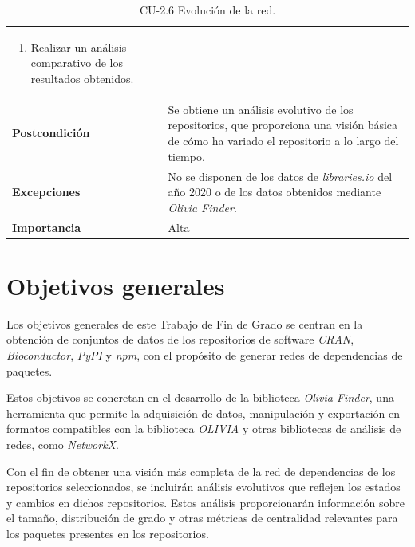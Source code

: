 \begin{table}[p]
\begin{tabularx}{\linewidth}{ p{} p{} }
\begin{enumerate}
			                                \item Realizar un análisis comparativo de los resultados obtenidos.
		                                \end{enumerate}                                                              \\
		\textbf{Postcondición}        & Se obtiene un análisis evolutivo de los repositorios, que proporciona una visión básica de cómo ha variado el repositorio a lo largo del tiempo.                                          \\
		\textbf{Excepciones}          & No se disponen de los datos de \textit{libraries.io} del año 2020 o de los datos obtenidos mediante \textit{Olivia Finder}.                                                               \\
		\textbf{Importancia}          & Alta                                                                                                                                                                                      \\
		\bottomrule
	\end{tabularx}
	\caption{CU-2.6 Evolución de la red.}
	\label{tab:cu2.6}
\end{table}


\section{Objetivos generales}

Los objetivos generales de este Trabajo de Fin de Grado se centran en la obtención de conjuntos de
datos de los repositorios de software \textit{CRAN}, \textit{Bioconductor}, \textit{PyPI} y \textit{npm},
con el propósito de generar redes de dependencias de paquetes.

Estos objetivos se concretan en el desarrollo de la biblioteca \textit{Olivia Finder}, una herramienta
que permite la adquisición de datos, manipulación y exportación en formatos compatibles con la
biblioteca \textit{OLIVIA} y otras bibliotecas de análisis de redes, como \textit{NetworkX}.

Con el fin de obtener una visión más completa de la red de dependencias de los repositorios
seleccionados, se incluirán análisis evolutivos que reflejen los estados y cambios en dichos repositorios.
Estos análisis proporcionarán información sobre el tamaño, distribución de grado y otras métricas de
centralidad relevantes para los paquetes presentes en los repositorios.

